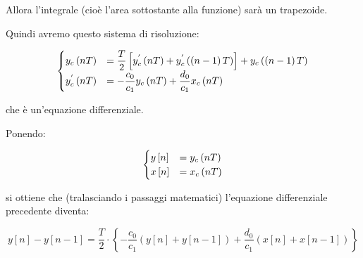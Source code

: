 Allora l'integrale (cioè l'area sottostante alla funzione) sarà un trapezoide. \newline 

Quindi avremo questo sistema di risoluzione: 

{
    \Large 
    \begin{equation}
        \setlength{\jot}{10pt} %
        \begin{cases}
            y_c \left(nT\right) 
            &= 
            \dfrac{T}{2}
            \left[
                y^{'}_c \left(nT\right)
                +
                y^{'}_c \left(\left(n-1\right)T\right)
            \right]
            +
            y_c \left(\left(n-1\right)T\right)
            \\
            y^{'}_c \left(nT\right)
            &= 
            - \dfrac{c_0}{c_1}    
            y_c \left(nT\right)
            +
            \dfrac{d_0}{c_1}    
            x_c \left(nT\right) 
        \end{cases}
    \end{equation}
}

che è un'equazione differenziale. \newline 

Ponendo: 

{
    \Large 
    \begin{equation}
        \setlength{\jot}{10pt} %
        \begin{cases}
            y \left[ n\right] 
            &= 
            y_c \left(nT\right)
            \\
            x \left[ n\right]
            &= 
            x_c \left(nT\right)
        \end{cases}
    \end{equation}
}

si ottiene che (tralasciando i passaggi matematici) l'equazione differenziale precedente diventa: 

{
    \Large 
    \begin{equation}
        y \left[ n\right] 
        -
        y \left[ n - 1\right] 
        = 
        \dfrac{T}{2} 
        \cdot 
        \left\{
            - \dfrac{c_0}{c_1} 
            \left(
                y \left[ n\right] 
                + 
                y \left[ n - 1\right]
            \right)
            + 
            \dfrac{d_0}{c_1} 
            \left(
                x \left[ n\right] 
                + 
                x \left[ n - 1\right]
            \right)
        \right\}
    \end{equation}
}

